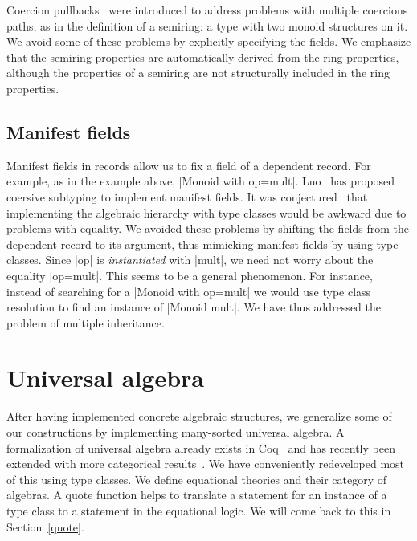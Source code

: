 \documentclass[a4paper,10pt, runningheads]{llncs}
\begin{document}
Coercion pullbacks~\cite{Hints} were introduced to address problems with multiple coercions paths,
as in the definition of a semiring: a type with two monoid structures on it. We avoid some
of these problems by explicitly specifying the fields. We emphasize that the semiring properties are automatically derived from the ring
properties, although the properties of a semiring are not structurally included in the ring
properties.

\subsection{Manifest fields}\label{manifest}

Manifest fields in records allow us to fix a field of a dependent record. For example, as in the
example above, |Monoid with op=mult|. 
Luo~\cite{DBLP:conf/types/Luo08} has proposed coersive subtyping to implement manifest fields.
It was conjectured~\cite{Hints} that implementing the algebraic hierarchy with type classes would
be awkward due to problems with equality. We avoided these problems by shifting the fields
from the dependent record to its argument, thus mimicking manifest fields by using type classes.
Since |op| is \emph{instantiated} with |mult|, we need not worry about the
equality |op=mult|. This seems to be a general phenomenon. For instance, instead of searching
for a |Monoid with op=mult| we would use type class resolution to find an instance of |Monoid mult|.
We have thus addressed the problem of multiple inheritance.

\section{Universal algebra}\label{univ}
After having implemented concrete algebraic structures, we generalize some of our constructions
by implementing many-sorted universal algebra. A formalization of universal algebra
already exists in Coq~\cite{DBLP:conf/tphol/Capretta99} and has recently been extended with
more categorical results~\cite{dominguez2008formalizing}. We have conveniently redeveloped most of
this using type classes. We define equational theories and their category of algebras. A quote
function helps to translate a statement for an instance of a type class to a statement in the
equational logic. We will come back to this in Section~\ref{quote}.

\end{document}
